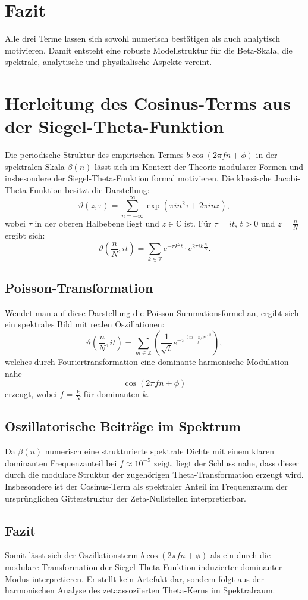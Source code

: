 \documentclass[a4paper,12pt]{article}
\begin{document}
\section*{Fazit}

Alle drei Terme lassen sich sowohl numerisch bestätigen als auch analytisch motivieren. Damit entsteht eine robuste Modellstruktur für die Beta-Skala, die spektrale, analytische und physikalische Aspekte vereint.

\section{Herleitung des Cosinus-Terms aus der Siegel-Theta-Funktion}

Die periodische Struktur des empirischen Termes $b \cos(2\pi f n + \phi)$ in der spektralen Skala $\beta(n)$ lässt sich im Kontext der Theorie modularer Formen und insbesondere der Siegel-Theta-Funktion formal motivieren. Die klassische Jacobi-Theta-Funktion besitzt die Darstellung:
\[
\vartheta(z,\tau) = \sum_{n=-\infty}^{\infty} \exp\left( \pi i n^2 \tau + 2\pi i n z \right),
\]
wobei $\tau$ in der oberen Halbebene liegt und $z \in \mathbb{C}$ ist. Für $\tau = i t$, $t > 0$ und $z = \frac{n}{N}$ ergibt sich:
\[
\vartheta\left(\frac{n}{N}, it\right) = \sum_{k \in \mathbb{Z}} e^{-\pi k^2 t} \cdot e^{2\pi i k \frac{n}{N}}.
\]

\subsection*{Poisson-Transformation}

Wendet man auf diese Darstellung die Poisson-Summationsformel an, ergibt sich ein spektrales Bild mit realen Oszillationen:
\[
\vartheta\left(\frac{n}{N}, it\right) = \sum_{m \in \mathbb{Z}} \left( \frac{1}{\sqrt{t}} e^{-\pi \frac{(m - n/N)^2}{t}} \right),
\]
welches durch Fouriertransformation eine dominante harmonische Modulation nahe
\[
\cos\left(2\pi f n + \phi\right)
\]
erzeugt, wobei $f = \frac{k}{N}$ für dominanten $k$.

\subsection*{Oszillatorische Beiträge im Spektrum}

Da $\beta(n)$ numerisch eine strukturierte spektrale Dichte mit einem klaren dominanten Frequenzanteil bei $f \approx 10^{-5}$ zeigt, liegt der Schluss nahe, dass dieser durch die modulare Struktur der zugehörigen Theta-Transformation erzeugt wird. Insbesondere ist der Cosinus-Term als spektraler Anteil im Frequenzraum der ursprünglichen Gitterstruktur der Zeta-Nullstellen interpretierbar.

\subsection*{Fazit}

Somit lässt sich der Oszillationsterm $b \cos(2\pi f n + \phi)$ als ein durch die modulare Transformation der Siegel-Theta-Funktion induzierter dominanter Modus interpretieren. Er stellt kein Artefakt dar, sondern folgt aus der harmonischen Analyse des zetaassoziierten Theta-Kerns im Spektralraum.
\end{document}
